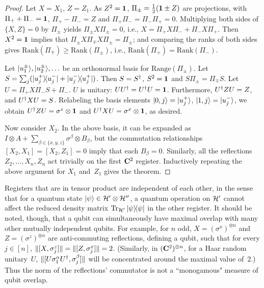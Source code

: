 \documentclass[preprintnumbers,11pt,onecolumn]{article}
\begin{document}
\begin{proof}
Let $X = X_1$, $Z = Z_1$.  As $Z^2 = \boldsymbol{1}$, $\Pi_\pm = \tfrac12 (\boldsymbol{1} \pm Z)$ are projections, with $\Pi_+ + \Pi_- = \boldsymbol{1}$, $\Pi_+ - \Pi_- = Z$ and $\Pi_+ \Pi_- = \Pi_- \Pi_+ = 0$.  Multiplying both sides of $\{X, Z\} = 0$ by $\Pi_\pm$ yields $\Pi_\pm X \Pi_\pm = 0$, i.e., $X = \Pi_+ X \Pi_- + \Pi_- X \Pi_+$.  Then $X^2 = \boldsymbol{1}$ implies that $\Pi_\pm X \Pi_\mp X \Pi_\pm = \Pi_\pm$; and comparing the ranks of both sides gives $\mathrm{Rank}(\Pi_\mp) \geq \mathrm{Rank}(\Pi_\pm)$, i.e., $\mathrm{Rank}(\Pi_+) = \mathrm{Rank}(\Pi_-)$.  

Let ${|u_1^\pm\rangle}, {|u_2^\pm\rangle}, \ldots$ be an orthonormal basis for $\mathrm{Range}(\Pi_\pm)$.  Let $S = \sum_j ({{|u_j^+\rangle}\!{\langle u_j^-|}} + {{|u_j^-\rangle}\!{\langle u_j^+|}})$.  Then $S = S^\dagger$, $S^2 = \boldsymbol{1}$ and $S \Pi_\pm = \Pi_\mp S$.  Let $U = \Pi_+ X \Pi_- S + \Pi_-$.  $U$ is unitary: $U U^\dagger = U^\dagger U = \boldsymbol{1}$.  Furthermore, $U^\dagger Z U = Z$, and $U^\dagger X U = S$.  Relabeling the basis elements ${|0, j\rangle} = {|u_j^+\rangle}$, ${|1, j\rangle} = {|u_j^-\rangle}$, we obtain $U^\dagger Z U = \sigma^z \otimes \boldsymbol{1}$ and $U^\dagger X U = \sigma^x \otimes \boldsymbol{1}$, as desired.  

Now consider $X_2$.  In the above basis, it can be expanded as $I \otimes A + \sum_{\beta \in \{x,y,z\}} \sigma^\beta \otimes B_\beta$, but the commutation relationships $[X_2, X_1] = [X_2, Z_1] = 0$ imply that each $B_\beta = 0$.  Similarly, all the reflections $Z_2, \ldots, X_n, Z_n$ act trivially on the first ${\bf C}^2$ register.  Inductively repeating the above argument for $X_1$ and~$Z_1$ gives the theorem.  
\end{proof}

Registers that are in tensor product are independent of each other, in the sense that for a quantum state ${|\psi\rangle} \in {\mathcal H}' \otimes {\mathcal H}''$, a quantum operation on ${\mathcal H}'$ cannot affect the reduced density matrix $\operatorname{\operatorname{Tr}}_{{\mathcal H}'} {{|\psi\rangle}\!{\langle\psi|}}$ in the other register.  It should be noted, though, that a qubit can simultaneously have maximal overlap with many other mutually independent qubits.  For example, for $n$ odd, $X = (\sigma^x)^{\otimes n}$ and $Z = (\sigma^z)^{\otimes n}$ are anti-commuting reflections, defining a qubit, such that for every $j \in [n]$, ${\| [X, \sigma^z_j] \|} = {\| [Z, \sigma^x_j] \|} = 2$.  (Similarly, in $({\bf C}^2)^{\otimes n}$, for a Haar random unitary~$U$, ${\| [U \sigma^\alpha_1 U^\dagger, \sigma^\beta_j] \|}$ will be concentrated around the maximal value of~$2$.)  Thus the norm of the reflections' commutator is not a ``monogamous" measure of qubit overlap.  
\end{document}
